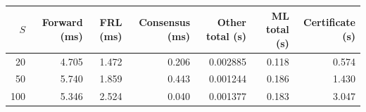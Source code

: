 \begin{tabular}{rrrrrrr}
\toprule
$S$ & Forward (ms) & FRL (ms) & Consensus (ms) & Other total (s) & ML total (s) & Certificate (s) \\
\midrule
20 & 4.705 & 1.472 & 0.206 & 0.002885 & 0.118 & 0.574 \\
50 & 5.740 & 1.859 & 0.443 & 0.001244 & 0.186 & 1.430 \\
100 & 5.346 & 2.524 & 0.040 & 0.001377 & 0.183 & 3.047 \\
\bottomrule
\end{tabular}
